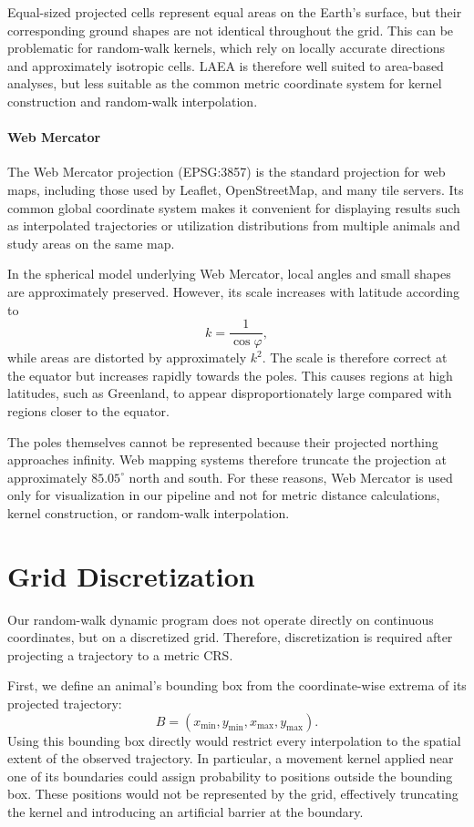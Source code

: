 Equal-sized projected cells represent equal areas on the Earth's surface, but their corresponding ground shapes are not identical throughout the grid. 
This can be problematic for random-walk kernels, which rely on locally accurate directions and approximately isotropic cells. 
LAEA is therefore well suited to area-based analyses, but less suitable as the common metric coordinate system for kernel construction and random-walk interpolation.



\paragraph{Web Mercator}
The Web Mercator projection (EPSG:3857) is the standard projection for web maps, including those used by Leaflet, OpenStreetMap, and many tile servers. 
Its common global coordinate system makes it convenient for displaying results such as interpolated trajectories or utilization distributions from multiple animals and study areas on the same map.

In the spherical model underlying Web Mercator, local angles and small shapes are approximately preserved. However, its scale increases with latitude according to
\[
k=\frac{1}{\cos\varphi},
\]
while areas are distorted by approximately \(k^2\).
The scale is therefore correct at the equator but increases rapidly towards the poles.
This causes regions at high latitudes, such as Greenland, to appear disproportionately large compared with regions closer to the equator.

The poles themselves cannot be represented because their projected northing approaches infinity.
Web mapping systems therefore truncate the projection at approximately \(85.05^\circ\) north and south.
For these reasons, Web Mercator is used only for visualization in our pipeline and not for metric distance calculations, kernel construction, or random-walk interpolation.

\section{Grid Discretization}
\label{sec:grid-discretization}

Our random-walk dynamic program does not operate directly on continuous coordinates, but on a discretized grid. Therefore, discretization is required after projecting a trajectory to a metric CRS.

First, we define an animal's bounding box from the coordinate-wise extrema of its projected trajectory:
\[
B
=
(x_{\min},y_{\min},x_{\max},y_{\max}).
\]
Using this bounding box directly would restrict every interpolation to the spatial extent of the observed trajectory. In particular, a movement kernel applied near one of its boundaries could assign probability to positions outside the bounding box. These positions would not be represented by the grid, effectively truncating the kernel and introducing an artificial barrier at the boundary.

